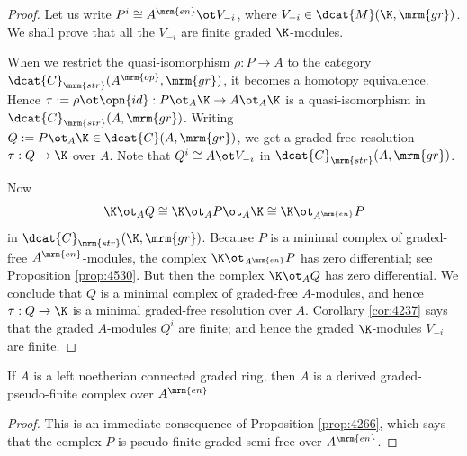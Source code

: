 \begin{proof}
Let us write $P^{i} \cong A^{\mrm{en}} \ot V_{-i}$, where 
$V_{-i} \in \dcat{M}(\K, \mrm{gr})$. We shall prove that all the
$V_{-i}$ are finite graded $\K$-modules. 

When we restrict the quasi-isomorphism $\rho : P \to A$
to the category $\dcat{C}_{\mrm{str}}(A^{\mrm{op}}, \mrm{gr})$, 
it becomes a homotopy equivalence. Hence 
$\tau := \rho \ot \opn{id} : P \ot_{A} \K \to A \ot_{A} \K$
is a quasi-isomorphism in $\dcat{C}_{\mrm{str}}(A, \mrm{gr})$. 
Writing 
$Q := P \ot_{A} \K \in \dcat{C}(A, \mrm{gr})$,
we get a graded-free resolution 
$\tau : Q \to \K$ over $A$. Note that 
$Q^{i} \cong A \ot V_{-i}$ in $\dcat{C}_{\mrm{str}}(A, \mrm{gr})$.

Now 
\begin{equation} \label{eqn:5433}
\K \ot_A Q \cong \K \ot_A P \ot_A \K \cong \K \ot_{A^{\mrm{en}}} P
\end{equation}
in $\dcat{C}_{\mrm{str}}(\K, \mrm{gr})$. Because $P$ is a minimal 
complex of graded-free $A^{\mrm{en}}$-modules, 
the complex $\K \ot_{A^{\mrm{en}}} P$ has zero differential; see 
Proposition \ref{prop:4530}.
But then the complex $\K \ot_A Q$ has zero differential. We conclude that $Q$ 
is a minimal complex of graded-free $A$-modules, and hence 
$\tau : Q \to \K$ is a minimal graded-free resolution over $A$. Corollary 
\ref{cor:4237} says that the graded $A$-modules $Q^i$ are finite; and hence the 
graded $\K$-modules $V_{-i}$ are finite. 
\end{proof}

\begin{cor} \label{cor:4531}
If $A$ is a left noetherian connected graded ring, then $A$ is a 
derived graded-pseudo-finite complex over $A^{\mrm{en}}$. 
\end{cor}

\begin{proof}
This is an immediate consequence of Proposition \ref{prop:4266},
which says that the complex $P$ is pseudo-finite graded-semi-free over 
$A^{\mrm{en}}$.
\end{proof}

